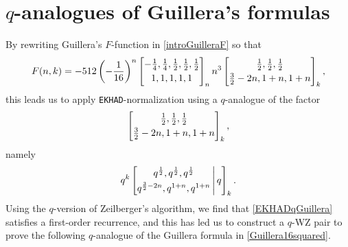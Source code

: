 \documentclass[12pt]{article}
\begin{document}
\section{$q$-analogues of Guillera's formulas}
 By rewriting Guillera's $F$-function in \eqref{introGuilleraF} so that 
\begin{equation*}
 F(n, k) = -512 \left( -\frac{1}{16} \right)^{n} \left[ \begin{matrix} 
 -\frac{1}{4}, \frac{1}{4}, \frac{1}{2}, \frac{1}{2}, \frac{1}{2} \vspace{1mm} \\ 
 1, 1, 1, 1, 1 \end{matrix} \right]_{n} 
 n^3 \left[ \begin{matrix} 
 \frac{1}{2}, \frac{1}{2}, \frac{1}{2} \vspace{1mm} \\ 
 \frac{3}{2} - 2 n, 1 + n, 1 + n \end{matrix} \right]_{k}, 
\end{equation*}
 this leads us to apply {\tt EKHAD}-normalization using a $q$-analogue of the factor 
\begin{equation}\label{firstlabelqGuillera}
 \left[ \begin{matrix} 
 \frac{1}{2}, \frac{1}{2}, \frac{1}{2} \vspace{1mm} \\ 
 \frac{3}{2} - 2 n, 1 + n, 1 + n \end{matrix} \right]_{k}, 
\end{equation}
 namely 
\begin{equation}\label{EKHADqGuillera}
 q^{k} \left[ \begin{matrix} q^{\frac{1}{2}}, q^{\frac{1}{2}}, q^{\frac{1}{2}} \vspace{1mm} \\ 
 q^{\frac{3}{2} - 2 n}, q^{1+n}, q^{1+n} \end{matrix} \, \Bigg| \, q \right]_{k}. 
\end{equation}
 Using the $q$-version of Zeilberger's algorithm, 
 we find that \eqref{EKHADqGuillera} satisfies a first-order recurrence, 
 and this has led us to construct 
 a $q$-WZ pair to prove the following $q$-analogue of the Guillera formula in 
 \eqref{Guillera16squared}. 
\end{document}
